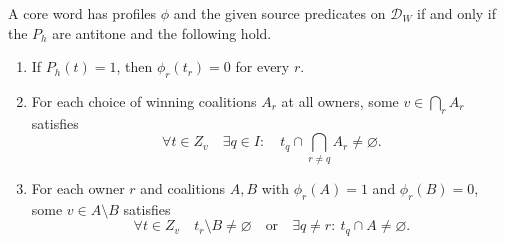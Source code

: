 \begin{theorem}
\label{core:thm:uncolored-head-profiles}
A core word has profiles $\phi$ and the given source predicates on
$\mathcal D_W$ if and only if the $P_h$ are antitone and the following hold.
\begin{enumerate}
\item If $P_h(t)=1$, then $\phi_r(t_r)=0$ for every $r$.
\item For each choice of winning coalitions $A_r$ at all owners,
some $v\in\bigcap_r A_r$ satisfies
\[
  \forall t\in Z_v\quad \exists q\in I:\quad
             t_q\cap\bigcap_{r\ne q}A_r\ne\varnothing .
\]
\item For each owner $r$ and coalitions $A,B$ with
$\phi_r(A)=1$ and $\phi_r(B)=0$, some $v\in A\setminus B$ satisfies
\[
 \forall t\in Z_v\quad
 t_r\setminus B\ne\varnothing
 \quad\text{or}\quad
 \exists q\ne r:\ t_q\cap A\ne\varnothing .
\]
\end{enumerate}
\end{theorem}
